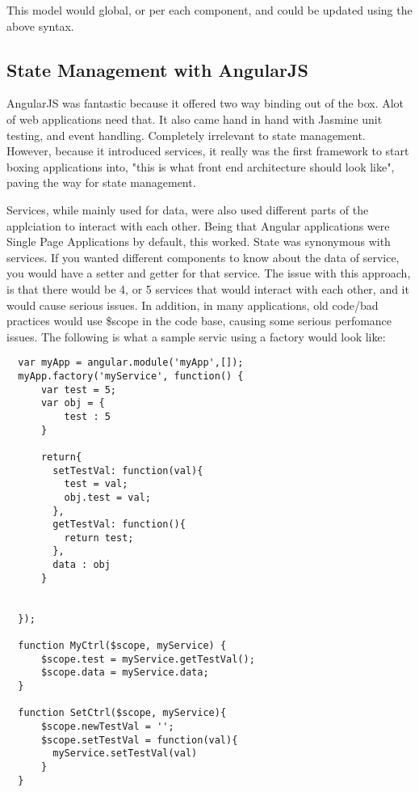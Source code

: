This model would global, or per each component, and could be updated using the
above syntax.

\subsection{ State Management with AngularJS }
AngularJS was fantastic because it offered two way binding out of the box. Alot
of web applications need that. It also came hand in hand with Jasmine unit
testing, and event handling. Completely irrelevant to state management. However,
because it introduced services, it really was the first framework to start boxing
applications into, "this is what front end architecture should look like",
paving the way for state management.

Services, while mainly used for data, were also used different parts of the
applciation to interact with each other. Being that Angular applications were
Single Page Applications by default, this worked. State was synonymous with
services. If you wanted different components to know about the data of service,
you would have a setter and getter for that service. The issue with this
approach, is that there would be 4, or 5 services that would interact with each
other, and it would cause serious issues. In addition, in many applications, old
code/bad practices would use \$scope in the code base, causing some serious
perfomance issues. The following is what a sample servic using a factory would
look like:

\begin{lstlisting}
  var myApp = angular.module('myApp',[]);
  myApp.factory('myService', function() {
      var test = 5;
      var obj = {
          test : 5
      }

      return{
        setTestVal: function(val){
          test = val;
          obj.test = val;
        },
        getTestVal: function(){
          return test;
        },
        data : obj
      }


  });

  function MyCtrl($scope, myService) {
      $scope.test = myService.getTestVal();
      $scope.data = myService.data;
  }

  function SetCtrl($scope, myService){
      $scope.newTestVal = '';
      $scope.setTestVal = function(val){
        myService.setTestVal(val)
      }
  }
\end{lstlisting}


